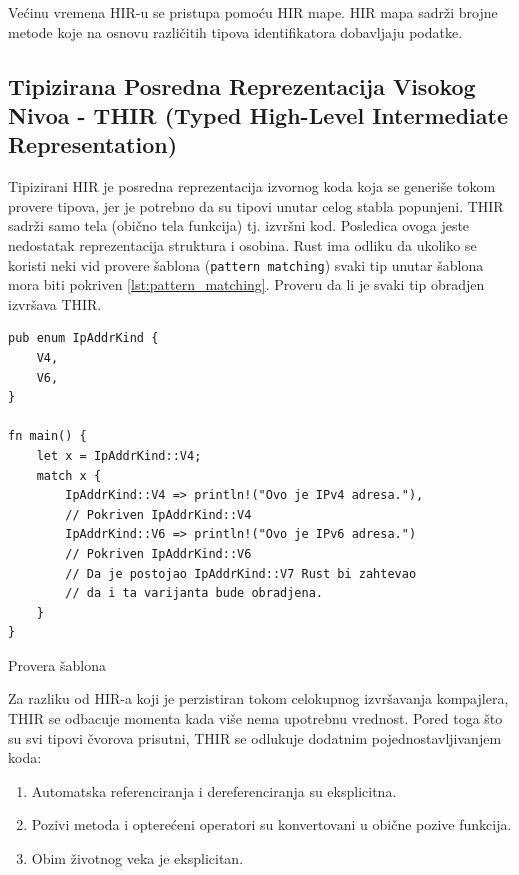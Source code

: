 \documentclass[11pt]{article}
\begin{document}
Većinu vremena HIR-u se pristupa pomoću HIR mape. HIR mapa sadrži brojne metode 
koje na osnovu različitih tipova identifikatora dobavljaju podatke.

\newpage
\subsection{Tipizirana Posredna Reprezentacija Visokog Nivoa - THIR (Typed High-Level Intermediate Representation)}

Tipizirani HIR je posredna reprezentacija izvornog koda koja se generiše tokom provere tipova, jer je potrebno
da su tipovi unutar celog stabla popunjeni. THIR sadrži samo tela (obično tela funkcija) tj. izvršni kod.
Posledica ovoga jeste nedostatak reprezentacija struktura i osobina. 
Rust ima odliku da ukoliko se koristi neki vid provere šablona (\verb|pattern matching|) svaki tip unutar 
šablona mora biti pokriven \ref{lst:pattern_matching}. Proveru da li je svaki tip obradjen izvršava THIR.

\begin{listing}[H]
\begin{verbatim}
pub enum IpAddrKind {
    V4,
    V6,
}

fn main() {
    let x = IpAddrKind::V4;
    match x {
        IpAddrKind::V4 => println!("Ovo je IPv4 adresa."), 
        // Pokriven IpAddrKind::V4
        IpAddrKind::V6 => println!("Ovo je IPv6 adresa.") 
        // Pokriven IpAddrKind::V6
        // Da je postojao IpAddrKind::V7 Rust bi zahtevao 
        // da i ta varijanta bude obradjena.
    }
}
\end{verbatim}
\caption{Provera šablona}
\label{lst:pattern_matching}
\end{listing}

Za razliku od HIR-a koji je perzistiran tokom celokupnog izvršavanja kompajlera, THIR se odbacuje momenta
kada više nema upotrebnu vrednost. Pored toga što su svi tipovi čvorova prisutni, THIR se odlukuje dodatnim 
pojednostavljivanjem koda:
\begin{enumerate}
    \item Automatska referenciranja i dereferenciranja su eksplicitna.
    \item Pozivi metoda i opterećeni operatori su konvertovani u obične pozive funkcija. 
    \item Obim životnog veka je eksplicitan.
\end{enumerate}
\end{document}
